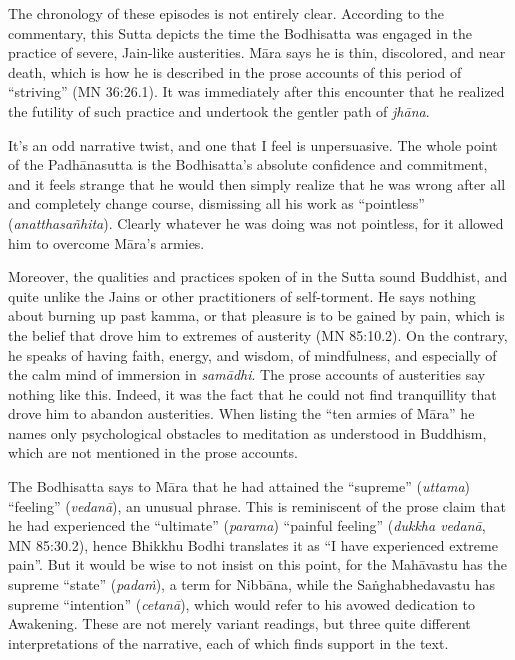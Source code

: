 \documentclass[12pt,openany]{book}%
\begin{document}
The chronology of these episodes is not entirely clear. According to the commentary, this Sutta depicts the time the Bodhisatta was engaged in the practice of severe, Jain-like austerities. \textsanskrit{Māra} says he is thin, discolored, and near death, which is how he is described in the prose accounts of this period of “striving” (MN 36:26.1). It was immediately after this encounter that he realized the futility of such practice and undertook the gentler path of \textit{\textsanskrit{jhāna}}.

It’s an odd narrative twist, and one that I feel is unpersuasive. The whole point of the \textsanskrit{Padhānasutta} is the Bodhisatta’s absolute confidence and commitment, and it feels strange that he would then simply realize that he was wrong after all and completely change course, dismissing all his work as “pointless” (\textit{\textsanskrit{anatthasañhita}}). Clearly whatever he was doing was not pointless, for it allowed him to overcome \textsanskrit{Māra}’s armies.

Moreover, the qualities and practices spoken of in the Sutta sound Buddhist, and quite unlike the Jains or other practitioners of self-torment. He says nothing about burning up past kamma, or that pleasure is to be gained by pain, which is the belief that drove him to extremes of austerity (MN 85:10.2). On the contrary, he speaks of having faith, energy, and wisdom, of mindfulness, and especially of the calm mind of immersion in \textit{\textsanskrit{samādhi}}. The prose accounts of austerities say nothing like this. Indeed, it was the fact that he could not find tranquillity that drove him to abandon austerities. When listing the “ten armies of \textsanskrit{Māra}” he names only psychological obstacles to meditation as understood in Buddhism, which are not mentioned in the prose accounts.

The Bodhisatta says to \textsanskrit{Māra} that he had attained the “supreme” (\textit{uttama}) “feeling” (\textit{\textsanskrit{vedanā}}), an unusual phrase. This is reminiscent of the prose claim that he had experienced the “ultimate” (\textit{parama}) “painful feeling” (\textit{dukkha \textsanskrit{vedanā}}, MN 85:30.2), hence Bhikkhu Bodhi translates it as “I have experienced extreme pain”. But it would be wise to not insist on this point, for the \textsanskrit{Mahāvastu} has the supreme “state” (\textit{\textsanskrit{padaṁ}}), a term for \textsanskrit{Nibbāna}, while the \textsanskrit{Saṅghabhedavastu} has supreme “intention” (\textit{\textsanskrit{cetanā}}), which would refer to his avowed dedication to Awakening. These are not merely variant readings, but three quite different interpretations of the narrative, each of which finds support in the text.
\end{document}

